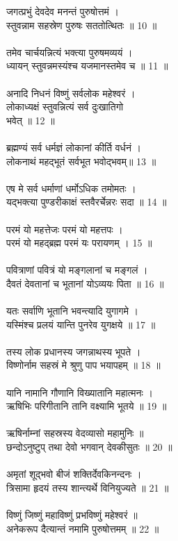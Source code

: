 जगत्प्रभुं देवदेव मनन्तं पुरुषोत्तमं ।\\
स्तुवन्नाम सहस्रेण पुरुषः सततोत्थितः ॥ 10 ॥\\
\\
तमेव चार्चयन्नित्यं भक्त्या पुरुषमव्ययं ।\\
ध्यायन् स्तुवन्नमस्यंश्च यजमानस्तमेव च ॥ 11 ॥\\
\\
अनादि निधनं विष्णुं सर्वलोक महेश्वरं ।\\
लोकाध्यक्षं स्तुवन्नित्यं सर्व दुःखातिगो \\
भवेत् ॥ 12 ॥\\
\\
ब्रह्मण्यं सर्व धर्मज्ञं लोकानां कीर्ति वर्धनं ।\\
लोकनाथं महद्भूतं सर्वभूत भवोद्भवम्॥ 13 ॥\\
\\
एष मे सर्व धर्माणां धर्मोऽधिक तमोमतः ।\\
यद्भक्त्या पुण्डरीकाक्षं स्तवैरर्चेन्नरः सदा ॥ 14 ॥\\
\\
परमं यो महत्तेजः परमं यो महत्तपः ।\\
परमं यो महद्ब्रह्म परमं यः परायणम् । 15 ॥\\
\\
पवित्राणां पवित्रं यो मङ्गलानां च मङ्गलं ।\\
दैवतं देवतानां च भूतानां योऽव्ययः पिता ॥ 16 ॥\\
\\
यतः सर्वाणि भूतानि भवन्त्यादि युगागमे ।\\
यस्मिंश्च प्रलयं यान्ति पुनरेव युगक्षये ॥ 17 ॥\\
\\
तस्य लोक प्रधानस्य जगन्नाथस्य भूपते ।\\
विष्णोर्नाम सहस्रं मे श्रुणु पाप भयापहम् ॥ 18 ॥\\
\\
यानि नामानि गौणानि विख्यातानि महात्मनः ।\\
ऋषिभिः परिगीतानि तानि वक्ष्यामि भूतये ॥ 19 ॥\\
\\
ऋषिर्नाम्नां सहस्रस्य वेदव्यासो महामुनिः ॥\\
छन्दोऽनुष्टुप् तथा देवो भगवान् देवकीसुतः ॥ 20 ॥\\
\\
अमृतां शूद्भवो बीजं शक्तिर्देवकिनन्दनः ।\\
त्रिसामा हृदयं तस्य शान्त्यर्थे विनियुज्यते ॥ 21 ॥\\
\\
विष्णुं जिष्णुं महाविष्णुं प्रभविष्णुं महेश्वरं ॥\\
अनेकरूप दैत्यान्तं नमामि पुरुषोत्तमम् ॥ 22 ॥\\
